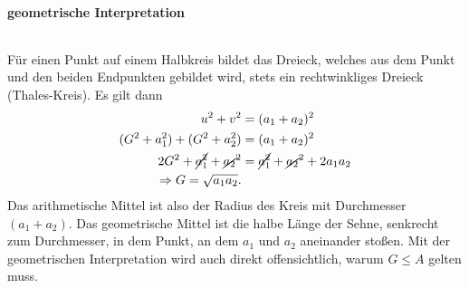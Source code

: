 \paragraph{geometrische Interpretation}$~$

\begin{wrapfigure}{r}{6cm}
    \centering
    \vspace{-5mm}
    \vspace{-5mm}
\end{wrapfigure}

Für einen Punkt auf einem Halbkreis bildet das Dreieck, welches aus dem Punkt und den beiden Endpunkten gebildet wird, stets ein rechtwinkliges Dreieck (Thales-Kreis). Es gilt dann 
\begin{align}
    u^2 + v^2 &= (a_1 + a_2)^2 \notag \\
    (G^2 + a_1^2) + (G^2 + a_2^2) &= (a_1 + a_2)^2 \notag \\
    2G^2 + \cancel{a_1^2} + \cancel{a_2}^2 &= \cancel{a_1^2} + \cancel{a_2}^2 + 2 a_1 a_2 \notag \\
    \Rightarrow G = \sqrt{a_1 a_2}. 
\end{align}
Das arithmetische Mittel ist also der Radius des Kreis mit Durchmesser $(a_1+a_2)$. Das geometrische Mittel ist die halbe Länge der Sehne, senkrecht zum Durchmesser, in dem Punkt, an dem $a_1$ und $a_2$ aneinander stoßen. Mit der geometrischen Interpretation wird auch direkt offensichtlich, warum $G \le A$ gelten muss.
